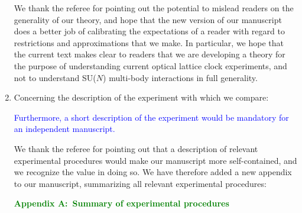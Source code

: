 \documentclass[preprint]{revtex4-1}
\newcommand{\1}{\mathds{1}}
\newcommand{\blue}[1]{\textcolor{blue}{#1}}
\newcommand{\green}[1]{\textcolor{green}{#1}}
\begin{document}
\begin{enumerate}
  We thank the referee for pointing out the potential to mislead
  readers on the generality of our theory, and hope that the new
  version of our manuscript does a better job of calibrating the
  expectations of a reader with regard to restrictions and
  approximations that we make.  In particular, we hope that the
  current text makes clear to readers that we are developing a theory
  for the purpose of understanding current optical lattice clock
  experiments, and not to understand SU($N$) multi-body interactions
  in full generality.


\item Concerning the description of the experiment with which we
  compare:

  \blue{Furthermore, a short description of the experiment would be
    mandatory for an independent manuscript.}

  \label{pt:description}

  We thank the referee for pointing out that a description of relevant
  experimental procedures would make our manuscript more
  self-contained, and we recognize the value in doing so.  We have
  therefore added a new appendix to our manuscript, summarizing all
  relevant experimental procedures:

  \green{{\bf Appendix A:~Summary of experimental procedures}}


\end{enumerate}
\end{document}
